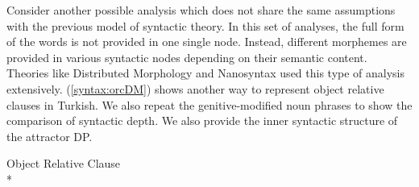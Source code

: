Consider another possible analysis which does not share the same assumptions with the previous model of syntactic theory. In this set of analyses, the full form of the words is not provided in one single node. Instead, different morphemes are provided in various syntactic nodes depending on their semantic content. Theories like Distributed Morphology \citep{HarleyNoyer99,HalleMarantz94} and Nanosyntax \citep{Starke2010, Taraldsen2010, Caha2009} used this type of analysis extensively. (\ref{syntax:orcDM}) shows another way to represent object relative clauses in Turkish. We also repeat the genitive-modified noun phrases to show the comparison of syntactic depth. We also provide the inner syntactic structure of the attractor DP.



    \ea 
    \ea \label{syntax:orcDM} {Object Relative Clause}\\*
    
